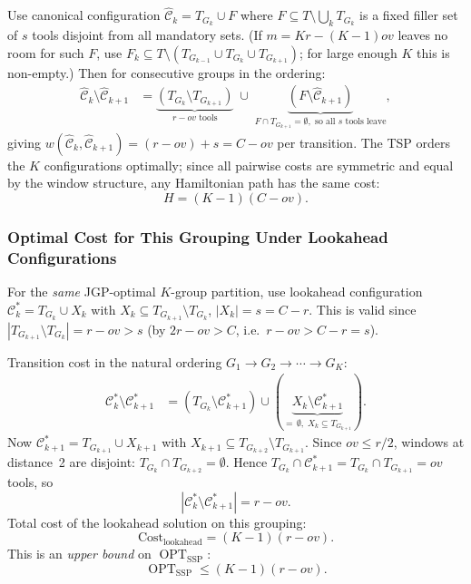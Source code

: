 \documentclass[11pt,a4paper]{article}
\theoremstyle{plain}
\theoremstyle{definition}
\DeclareMathOperator{\OPT}{OPT}
\newcommand{\sw}[2]{w(#1,#2)}
\begin{document}
Use canonical configuration $\hat{\mathcal{C}}_k=T_{G_k}\cup F$ where
$F\subseteq T\setminus\bigcup_k T_{G_k}$ is a fixed filler set of $s$ tools
disjoint from all mandatory sets.
(If $m=K r-(K-1)\mathit{ov}$ leaves no room for such $F$, use
$F_k\subseteq T\setminus(T_{G_{k-1}}\cup T_{G_k}\cup T_{G_{k+1}})$;
for large enough $K$ this is non-empty.)
Then for consecutive groups in the ordering:
\begin{align*}
  \hat{\mathcal{C}}_k\setminus\hat{\mathcal{C}}_{k+1}
  &=\underbrace{(T_{G_k}\setminus T_{G_{k+1}})}_{r-\mathit{ov}\text{ tools}}
   \;\cup\;
   \underbrace{(F\setminus\hat{\mathcal{C}}_{k+1})}_{F\cap T_{G_{k+1}}=\emptyset,\text{ so all }s\text{ tools leave}},
\end{align*}
giving $\sw{\hat{\mathcal{C}}_k}{\hat{\mathcal{C}}_{k+1}}=
(r-\mathit{ov})+s = C-\mathit{ov}$ per transition. The TSP orders the $K$
configurations optimally; since all pairwise costs are symmetric and equal by the
window structure, any Hamiltonian path has the same cost:
\begin{equation}
  \label{eq:H}
  H = (K-1)(C-\mathit{ov}).
\end{equation}

\subsubsection{Optimal Cost for This Grouping Under Lookahead Configurations}
\label{sec:lookahead}

For the \emph{same} JGP-optimal $K$-group partition, use lookahead configuration
$\mathcal{C}_k^*=T_{G_k}\cup X_k$ with
$X_k\subseteq T_{G_{k+1}}\setminus T_{G_k}$, $|X_k|=s=C-r$.
This is valid since $|T_{G_{k+1}}\setminus T_{G_k}|=r-\mathit{ov}>s$
(by $2r-\mathit{ov}>C$, i.e.\ $r-\mathit{ov}>C-r=s$).

\medskip\noindent Transition cost in the natural ordering
$G_1\to G_2\to\cdots\to G_K$:
\begin{align*}
  \mathcal{C}_k^*\setminus\mathcal{C}_{k+1}^*
  &= (T_{G_k}\setminus\mathcal{C}_{k+1}^*)\cup(\underbrace{X_k\setminus\mathcal{C}_{k+1}^*}_{=\,\emptyset,\;X_k\subseteq T_{G_{k+1}}}).
\end{align*}
Now $\mathcal{C}_{k+1}^*=T_{G_{k+1}}\cup X_{k+1}$ with
$X_{k+1}\subseteq T_{G_{k+2}}\setminus T_{G_{k+1}}$.
Since $\mathit{ov}\le r/2$, windows at distance~2 are disjoint:
$T_{G_k}\cap T_{G_{k+2}}=\emptyset$.
Hence $T_{G_k}\cap\mathcal{C}_{k+1}^*=T_{G_k}\cap T_{G_{k+1}}=\mathit{ov}$ tools, so
\[
  |\mathcal{C}_k^*\setminus\mathcal{C}_{k+1}^*|=r-\mathit{ov}.
\]
Total cost of the lookahead solution on this grouping:
\begin{equation}
  \label{eq:lookahead}
  \mathrm{Cost}_{\text{lookahead}}=(K-1)(r-\mathit{ov}).
\end{equation}
This is an \emph{upper bound} on $\OPT_{\mathrm{SSP}}$:
\begin{equation}
  \label{eq:UB}
  \OPT_{\mathrm{SSP}}\le (K-1)(r-\mathit{ov}).
\end{equation}
\end{document}
